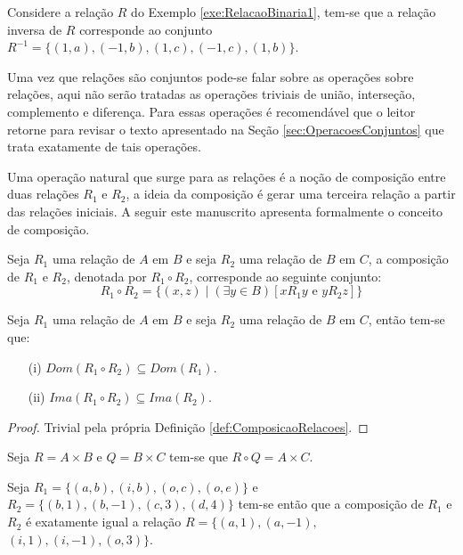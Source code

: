\begin{exem}
	Considere a relação $R$ do Exemplo \ref{exe:RelacaoBinaria1}, tem-se que a relação inversa de $R$ corresponde ao conjunto $R^{-1} = \{(1, a), (-1, b), (1, c), (-1, c), (1, b)\}$.
\end{exem}

Uma vez que relações são conjuntos pode-se falar sobre as operações sobre relações, aqui não serão tratadas as operações triviais de união, interseção, complemento e diferença. Para essas operações é recomendável que o leitor retorne para revisar o texto apresentado na Seção \ref{sec:OperacoesConjuntos} que trata exatamente de tais operações. 

Uma operação natural que surge para as relações é a noção de composição entre duas relações $R_1$ e $R_2$, a ideia da composição é gerar uma terceira relação a partir das relações iniciais. A seguir este manuscrito apresenta formalmente o conceito de composição.

\begin{definition}\label{def:ComposicaoRelacoes}
	Seja $R_1$ uma relação de $A$ em $B$ e seja $R_2$ uma relação de $B$ em $C$, a composição de $R_1$ e $R_2$, denotada por $R_1 \circ R_2$, corresponde ao seguinte conjunto:
	$$R_1 \circ R_2 = \{(x, z) \mid (\exists y \in B)[x\mathrel{R_1}y \text{ e } y\mathrel{R_2}z] \}$$ 
\end{definition}

\begin{prop}
	Seja $R_1$ uma relação de $A$ em $B$ e seja $R_2$ uma relação de $B$ em $C$, então tem-se que:
	\begin{itemize}
		\item[(i)] $Dom(R_1 \circ R_2) \subseteq Dom(R_1)$.
		\item[(ii)] $Ima(R_1 \circ R_2) \subseteq Ima(R_2)$.
	\end{itemize}
\end{prop}

\begin{proof}
	Trivial pela própria Definição \ref{def:ComposicaoRelacoes}.
\end{proof}

\begin{exem}
	Seja $R = A \times B$ e $Q = B \times C$ tem-se que $R \circ Q = A \times C$.
\end{exem}

\begin{exem}
	Seja $R_1 = \{(a, b), (i, b), (o, c), (o, e)\}$ e $R_2 = \{(b, 1), (b, -1), (c, 3), (d, 4)\}$ tem-se então que a composição de $R_1$ e $R_2$ é exatamente igual a relação $R = \{(a, 1), (a, -1),$ $(i, 1), (i, -1), (o, 3)\}$.
\end{exem}


